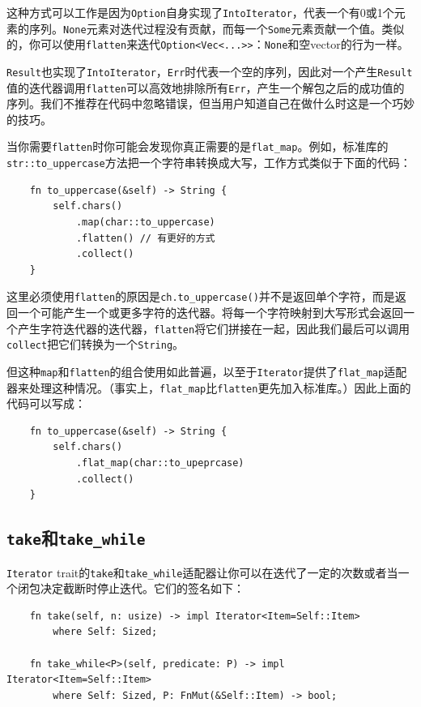 这种方式可以工作是因为\texttt{Option}自身实现了\texttt{IntoIterator}，代表一个有0或1个元素的序列。\texttt{None}元素对迭代过程没有贡献，而每一个\texttt{Some}元素贡献一个值。类似的，你可以使用\texttt{flatten}来迭代\texttt{Option<Vec<...>>}：\texttt{None}和空vector的行为一样。

\texttt{Result}也实现了\texttt{IntoIterator}，\texttt{Err}时代表一个空的序列，因此对一个产生\texttt{Result}值的迭代器调用\texttt{flatten}可以高效地排除所有\texttt{Err}，产生一个解包之后的成功值的序列。我们不推荐在代码中忽略错误，但当用户知道自己在做什么时这是一个巧妙的技巧。

当你需要\texttt{flatten}时你可能会发现你真正需要的是\texttt{flat\_map}。例如，标准库的\texttt{str::to\_uppercase}方法把一个字符串转换成大写，工作方式类似于下面的代码：
\begin{verbatim}
    fn to_uppercase(&self) -> String {
        self.chars()
            .map(char::to_uppercase)
            .flatten() // 有更好的方式
            .collect()
    }
\end{verbatim}

这里必须使用\texttt{flatten}的原因是\texttt{ch.to\_uppercase()}并不是返回单个字符，而是返回一个可能产生一个或更多字符的迭代器。将每一个字符映射到大写形式会返回一个产生字符迭代器的迭代器，\texttt{flatten}将它们拼接在一起，因此我们最后可以调用\texttt{collect}把它们转换为一个\texttt{String}。

但这种\texttt{map}和\texttt{flatten}的组合使用如此普遍，以至于\texttt{Iterator}提供了\texttt{flat\_map}适配器来处理这种情况。（事实上，\texttt{flat\_map}比\texttt{flatten}更先加入标准库。）因此上面的代码可以写成：
\begin{verbatim}
    fn to_uppercase(&self) -> String {
        self.chars()
            .flat_map(char::to_upeprcase)
            .collect()
    }
\end{verbatim}

\subsection{\texttt{take}和\texttt{take\_while}}
\texttt{Iterator} trait的\texttt{take}和\texttt{take\_while}适配器让你可以在迭代了一定的次数或者当一个闭包决定截断时停止迭代。它们的签名如下：
\begin{verbatim}
    fn take(self, n: usize) -> impl Iterator<Item=Self::Item>
        where Self: Sized;
    
    fn take_while<P>(self, predicate: P) -> impl Iterator<Item=Self::Item>
        where Self: Sized, P: FnMut(&Self::Item) -> bool;
\end{verbatim}

